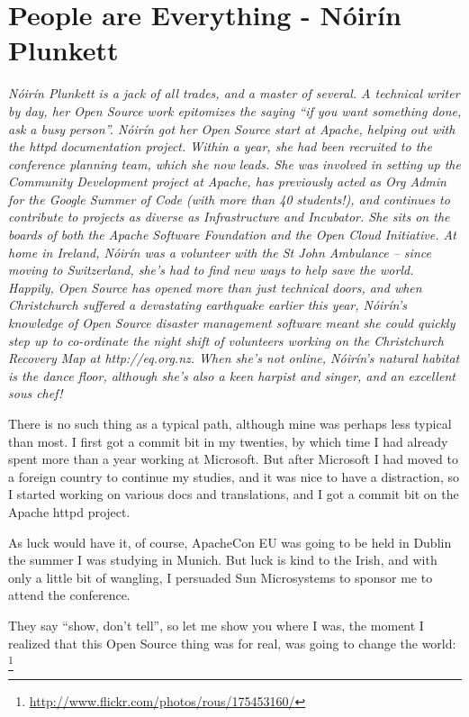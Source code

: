 \chapter{People are Everything - Nóirín Plunkett}

\textit{Nóirín Plunkett is a jack of all trades, and a master of several. A
technical writer by day, her Open Source work epitomizes the saying ``if you
want something done, ask a busy person''.
Nóirín got her Open Source start at Apache, helping out with the httpd
documentation project. Within a year, she had been recruited to the conference
planning team, which she now leads. She was involved in setting up the Community
Development project at Apache, has previously acted as Org Admin for the Google
Summer of Code (with more than 40 students!), and continues to contribute to
projects as diverse as Infrastructure and Incubator. She sits on the boards of
both the Apache Software Foundation and the Open Cloud Initiative.
At home in Ireland, Nóirín was a volunteer with the St John Ambulance -- since
moving to Switzerland, she’s had to find new ways to help save the world.
Happily, Open Source has opened more than just technical doors, and when
Christchurch suffered a devastating earthquake earlier this year, Nóirín’s
knowledge of Open Source disaster management software meant she could quickly step up to
co-ordinate the night shift of volunteers working on the Christchurch Recovery
Map at http://eq.org.nz.
When she’s not online, Nóirín’s natural habitat is the dance floor, although
she’s also a keen harpist and singer, and an excellent sous chef!}

There is no such thing as a typical path, although mine was perhaps
less typical than most. I first got a commit bit in my twenties, by
which time I had already spent more than a year working at Microsoft.
But after Microsoft I had moved to a foreign country to continue my
studies, and it was nice to have a distraction, so I started working
on various docs and translations, and I got a commit bit on the Apache
httpd project.

As luck would have it, of course, ApacheCon EU was going to be held in
Dublin the summer I was studying in Munich. But luck is kind to the
Irish, and with only a little bit of wangling, I persuaded Sun
Microsystems to sponsor me to attend the conference.

They say ``show, don't tell'', so let me show you where I was, the
moment I realized that this Open Source thing was for real, was going
to change the world: \footnote{\url{
http://www.flickr.com/photos/rous/175453160/}} 

